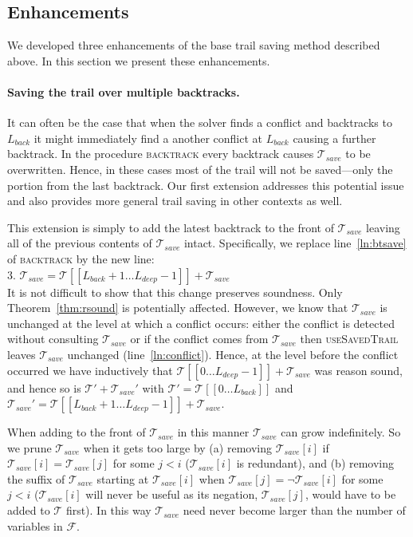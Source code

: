 \documentclass[runningheads]{llncs}
\newcommand{\trail}{\ensuremath{\mathcal{T}}}
\newcommand{\range}[2]{#1\ldots#2}
\newcommand{\formula}{\ensuremath{\mathcal{F}}}
\newcommand{\deepestLvl}{L_{\textit{deep}}}
\newcommand{\btL}{L_{\textit{back}}}
\newcommand{\trailsave}{\trail_{\mathit{save}}}
\newcommand{\bt}{\textsc{backtrack}\xspace}
\newcommand{\ust}{\textsc{useSavedTrail}\xspace}
\begin{document}
\subsection{Enhancements}
We developed three enhancements of the base trail saving method
described above. In this section we present these enhancements.

\paragraph{Saving the trail over multiple backtracks.}
It can often be the case that when the solver finds a conflict and
backtracks to $\btL$ it might immediately find a another conflict at
$\btL$ causing a further backtrack. In the procedure \bt every
backtrack causes $\trailsave$ to be overwritten. Hence, in these cases
most of the trail will not be saved---only the portion from the last
backtrack. Our first extension addresses this potential issue and also
provides more general trail saving in other contexts as well.

This extension is simply to add the latest backtrack to the front of
$\trailsave$ leaving all of the previous contents of $\trailsave$
intact. Specifically, we replace line~\ref{ln:btsave} of \bt by the new line:\\
\hspace*{3em}3. \qquad $\trailsave = \trail[[\range{\btL{+}1}{\deepestLvl{-}1}]] + \trailsave$\\
It is not difficult to show that this change preserves soundness. Only
Theorem~\ref{thm:rsound} is potentially affected. However, we know
that $\trailsave$ is unchanged at the level at which a conflict
occurs: either the conflict is detected without consulting
$\trailsave$ or if the conflict comes from $\trailsave$ then \ust
leaves $\trailsave$ unchanged (line~\ref{ln:conflict}). Hence, at the
level before the conflict occurred we have inductively that
$\trail[[\range{0}{\deepestLvl{-}1}]]+\trailsave$ was reason sound,
and hence so is $\trail'+\trailsave'$ with
$\trail' = \trail[[\range{0}{\btL}]]$ and
$\trailsave' = \trail[[\range{\btL{+}1}{\deepestLvl{-}1}]] +
\trailsave$.

When adding to the front of $\trailsave$ in this manner $\trailsave$
can grow indefinitely. So we prune $\trailsave$ when it gets too large
by (a) removing $\trailsave[i]$ if $\trailsave[i] = \trailsave[j]$ for
some $j<i$ ($\trailsave[i]$ is redundant), and (b) removing the suffix
of $\trailsave$ starting at $\trailsave[i]$ when
$\trailsave[j] = \lnot \trailsave[i]$ for some $j<i$ ($\trailsave[i]$
will never be useful as its negation, $\trailsave[j]$, would have to be
added to $\trail$ first). In this way $\trailsave$ need never become
larger than the number of variables in $\formula$.
\end{document}
